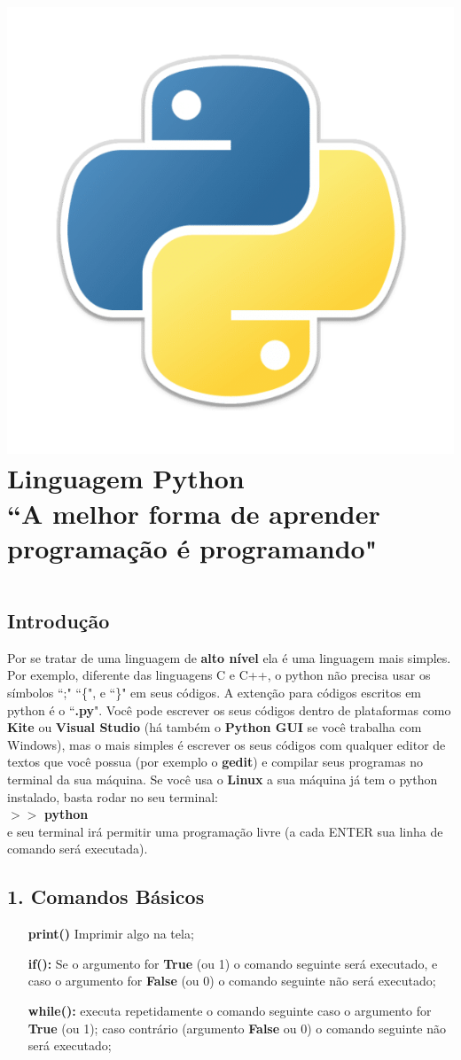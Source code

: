 \documentclass[a4paper]{book}
\begin{document}
	\thispagestyle{empty}
	\section*{\huge \center \includegraphics[width=.1\linewidth]{py_logo}\\Linguagem Python\\ \small  ``A melhor forma de aprender programação é programando" }
	$$ $$
		\subsection*{Introdução}
			Por se tratar de uma linguagem de \textbf{alto nível} ela é uma linguagem mais simples. Por exemplo, diferente das linguagens C e C++, o python não precisa usar  os símbolos ``;" ``\{", e ``\}" em seus códigos. A extenção para códigos escritos em python é o ``\textbf{.py}". Você pode escrever os seus códigos dentro de plataformas como \textbf{Kite} ou \textbf{Visual Studio} (há também o \textbf{Python GUI} se você trabalha com Windows), mas o mais simples é escrever os seus códigos com qualquer editor de textos que você possua (por exemplo o \textbf{gedit}) e compilar seus programas no terminal da sua máquina. Se você usa o \textbf{Linux} a sua máquina já tem o python instalado, basta rodar no seu terminal:\\
			$>>$  \textbf{python}\\
			e seu terminal irá permitir uma programação livre (a cada ENTER sua linha de comando será executada).
			
			
		\subsection*{1. Comandos Básicos}
			\begin{itemize}
				\item[\textbf{print()}] Imprimir algo na tela;
				\item[\textbf{if():}] Se o argumento for \textbf{True} (ou 1) o comando seguinte será executado, e caso o argumento for \textbf{False} (ou 0) o comando seguinte não será executado;
				\item[\textbf{while():}] executa repetidamente o comando seguinte caso o argumento for \textbf{True} (ou 1); caso contrário (argumento \textbf{False} ou 0) o comando seguinte não será executado;
			\end{itemize}
			
\end{document}
